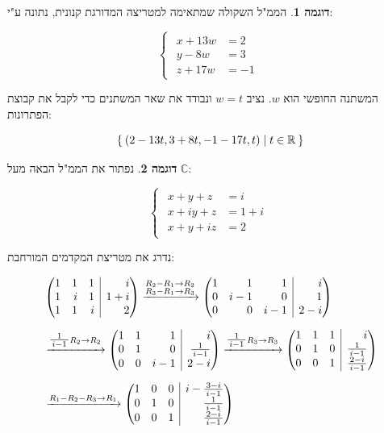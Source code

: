\documentclass[12pt]{report}
\theoremstyle{plain}
\theoremstyle{definition}
\newtheorem{example}{דוגמה}[chapter]
\newcommand{\R}{\mathbb{R}}
\newcommand{\C}{\mathbb{C}}
\newcommand{\0}{\mathbf{0}}
\begin{document}
\begin{example}
הממ"ל השקולה שמתאימה למטריצה המדורגת קנונית, נתונה ע"י:

$$
\begin{cases}
\begin{aligned}
x+13w &= 2 \\
y-8w &= 3 \\
z+17w &= -1
\end{aligned}
\end{cases}
$$

המשתנה החופשי הוא 
$w$.
נציב 
$w=t$
ונבודד את שאר המשתנים כדי לקבל את קבוצת הפתרונות:

$$\Set{(2-13t,3+8t,-1-17t,t)|t\in\R}$$

\end{example}

\begin{example}
נפתור את הממ"ל הבאה מעל
$\C$:

$$
\begin{cases}
\begin{aligned}
x  + y + z &= i \\
x+ iy + z &= 1+i \\
x + y + iz &= 2
\end{aligned}
\end{cases}
$$

נדרג את מטריצת המקדמים המורחבת:

$$
\begin{aligned}
&\left(\begin{array}{@{}rrr|r@{}}
1 & 1 & 1 & i \\
1 & i & 1 & 1 + i \\
1 & 1 & i & 2
\end{array}\right)
\xrightarrow{\substack{R_2 - R_1 \to R_2 \\ R_3 - R_1 \to R_3}}
\left(\begin{array}{@{}rrr|r@{}}
1 & 1 & 1 & i \\
0 & i - 1 & 0 & 1 \\
0 & 0 & i - 1 & 2 - i
\end{array}\right) \\[6pt]
&\xrightarrow{\tfrac{1}{\,i - 1\,} R_2 \to R_2}
\left(\begin{array}{@{}rrr|r@{}}
1 & 1 & 1 & i \\
0 & 1 & 0 & \tfrac{1}{\,i - 1\,} \\
0 & 0 & i - 1 & 2 - i
\end{array}\right)
\xrightarrow{\tfrac{1}{\,i - 1\,} R_3 \to R_3}
\left(\begin{array}{@{}rrr|r@{}}
1 & 1 & 1 & i \\
0 & 1 & 0 & \tfrac{1}{\,i - 1\,} \\
0 & 0 & 1 & \tfrac{2 - i}{\,i - 1\,}
\end{array}\right) \\[6pt]
&\xrightarrow{R_1 - R_2 - R_3 \to R_1}
\left(\begin{array}{@{}rrr|r@{}}
1 & 0 & 0 & i - \tfrac{3 - i}{\,i - 1\,} \\
0 & 1 & 0 & \tfrac{1}{\,i - 1\,} \\
0 & 0 & 1 & \tfrac{2 - i}{\,i - 1\,}
\end{array}\right)
\end{aligned}
$$


\end{example}
\end{document}
